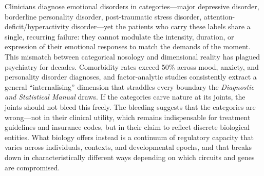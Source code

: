 


Clinicians diagnose emotional disorders in categories---major depressive
disorder, borderline personality disorder, post-traumatic stress disorder,
attention-deficit/hyperactivity disorder---yet the patients who carry these
labels share a single, recurring failure: they cannot modulate the intensity,
duration, or expression of their emotional responses to match the demands of
the moment.  This mismatch between categorical nosology and dimensional
reality has plagued psychiatry for decades.  Comorbidity rates exceed 50\%
across mood, anxiety, and personality disorder diagnoses, and factor-analytic
studies consistently extract a general ``internalising'' dimension that
straddles every boundary the \emph{Diagnostic and Statistical Manual}
draws.\cite{faustino2020}  If the categories carve nature at its joints, the joints
should not bleed this freely.  The bleeding suggests that the categories are
wrong---not in their clinical utility, which remains indispensable for
treatment guidelines and insurance codes, but in their claim to reflect
discrete biological entities.  What biology offers instead is a continuum of
regulatory capacity that varies across individuals, contexts, and
developmental epochs, and that breaks down in characteristically different
ways depending on which circuits and genes are compromised.

